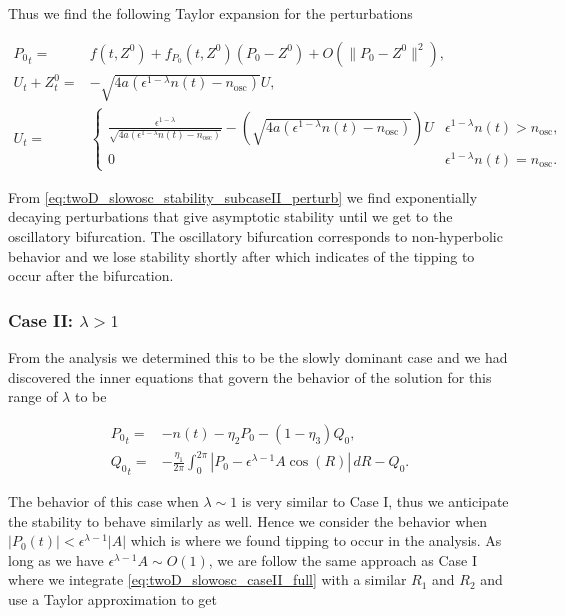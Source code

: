 Thus we find the following Taylor expansion for the perturbations

\begin{equation}\label{eq:twoD_slowosc_stability_subcaseII_perturb}
\begin{aligned}
{P_0}_t =& f(t,Z^0)+f_{P_0}(t,Z^0)(P_0-Z^0)+O(\lVert P_0-Z^0 \rVert^2),\\
U_t+Z^0_t=& -\sqrt{4a(\epsilon^{1-\lambda}n(t)-n_{\text{osc}})} U,\\
 U_t = & \begin{cases}
\frac{\epsilon^{1-\lambda}}{\sqrt{4a(\epsilon^{1-\lambda}n(t)-n_{\text{osc}})}}-\left(\sqrt{4a(\epsilon^{1-\lambda}n(t)-n_{\text{osc}})}\right) U & \epsilon^{1-\lambda}n(t)>n_{\text{osc}},\\
0 & \epsilon^{1-\lambda}n(t)=n_{\text{osc}}.
\end{cases}
\end{aligned}
\end{equation}

From \eqref{eq:twoD_slowosc_stability_subcaseII_perturb} we find exponentially decaying perturbations that give asymptotic stability until we get to the oscillatory bifurcation. The oscillatory bifurcation corresponds to non-hyperbolic behavior and we lose stability shortly after which indicates of the tipping to occur after the bifurcation.

\subsubsection{Case II: $\lambda>1$}

From the analysis we determined this to be the slowly dominant case and we had discovered the inner equations that govern the behavior of the solution for this range of $\lambda$ to be

\begin{equation}\label{eq:twoD_slowosc_caseII_full}
\begin{aligned}
{P_0}_t =& - n(t)-\eta_2 P_0 -(1-\eta_3)Q_0,\\
{Q_0}_t =& -\frac{\eta_1}{2\pi}\int_0^{2\pi}|P_0-\epsilon^{\lambda-1} A\cos(R)|\,dR - Q_0.
\end{aligned}
\end{equation}

The behavior of this case when $\lambda\sim 1$ is very similar to Case I, thus we anticipate the stability to behave similarly as well. Hence we consider the behavior when $|P_0(t)|<\epsilon^{\lambda-1}|A|$ which is where we found tipping to occur in the analysis. As long as we have $\epsilon^{\lambda-1}A\sim O(1)$, we are follow the same approach as Case I where we integrate \eqref{eq:twoD_slowosc_caseII_full} with a similar $R_1$ and $R_2$ and use a Taylor approximation to get


